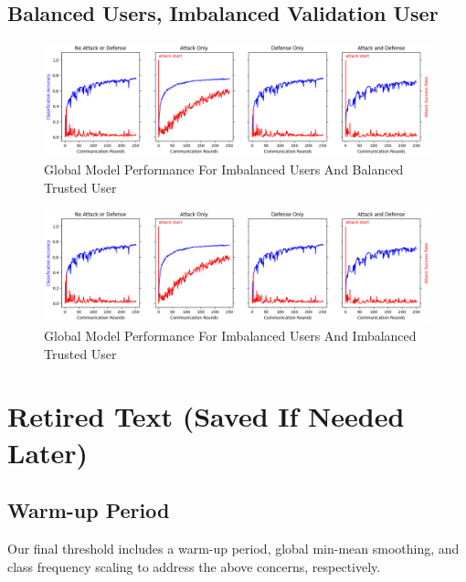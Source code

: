 \documentclass{article} %
\begin{document}
%
\subsection{Balanced Users, Imbalanced Validation User}
\label{sec.imbal_users}

\begin{figure}[H]
    \centering
    \includegraphics[width=\textwidth]{01_trusted/centralized/alpha1--alpha_val1/visuals/accuracy--n_malicious1--m_start1.png}
    \caption{Global Model Performance For Imbalanced Users And Balanced Trusted User}
    \label{fig:centralized--alpha1--alpha_val10000--accuracy--n_malicious1--m_start1}
\end{figure} 

\begin{figure}[H]
    \centering
    \includegraphics[width=\textwidth]{01_trusted/centralized/alpha1--alpha_val1/visuals/accuracy--n_malicious1--m_start1.png}
    \caption{Global Model Performance For Imbalanced Users And Imbalanced Trusted User}
    \label{fig:centralized--alpha1--alpha_val1--accuracy--n_malicious1--m_start1}
\end{figure} 



% 
\section{Retired Text (Saved If Needed Later)}

%
\subsection{Warm-up Period}

Our final threshold includes a warm-up period, global min-mean smoothing, and class frequency scaling to address the above concerns, respectively.
\end{document}
